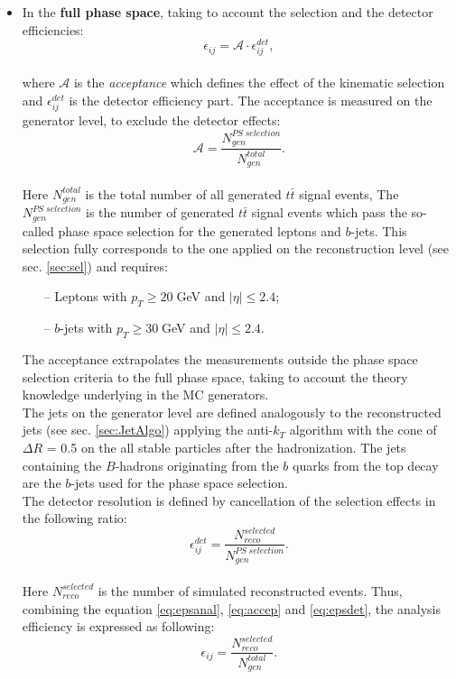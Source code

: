 \begin{itemize}
 \item In the \textbf{full phase space}, taking to account the selection and the detector efficiencies:
 \begin{equation}\label{eq:epsanal}
  \epsilon_{ij} = \mathcal{A} \cdot \epsilon_{ij}^{det},
 \end{equation}
 \\
 where $\mathcal{A}$ is the \textit{acceptance} which defines the effect of the kinematic selection and $\epsilon_{ij}^{det}$ is the detector efficiency part.
 The acceptance is measured on the generator level, to exclude the detector effects:
 \\
 \begin{equation}\label{eq:accep}
  \mathcal{A} = \frac{N^{PS\;selection}_{gen}}{N^{total}_{gen}}.
 \end{equation}
 \\
 Here $N^{total}_{gen}$ is the total number of all generated $t\bar{t}$ signal events,
 The $N_{gen}^{PS\;selection}$ is the number of generated $t\bar{t}$ signal events which pass the so-called phase space selection for the generated leptons and 
 $b$-jets. This selection fully corresponds to the one applied on the reconstruction level (see sec. \ref{sec:sel}) and requires:
 \begin{itemize}
  \item[--] Leptons with $p_{T} \geq 20\;$GeV and $|\eta| \leq 2.4$;
  \item[--] $b$-jets with $p_{T} \geq 30\;$GeV and $|\eta| \leq 2.4$.
 \end{itemize}
 The acceptance extrapolates the measurements outside the phase space selection criteria to the full phase space, taking to account the theory knowledge underlying in the MC generators.
 \\
 The jets on the generator level are defined analogously to the reconstructed jets (see sec. \ref{sec:JetAlgo}) applying the anti-$k_{T}$ algorithm with the 
 cone of $\Delta R$ = 0.5 on the all stable particles after the hadronization. The jets containing the $B$-hadrons originating from the $b$ quarks from the
 top decay are the $b$-jets used for the phase space selection.
 \\
 The detector resolution is defined by cancellation of the selection effects in the following ratio:
 \\
 \begin{equation}\label{eq:epsdet}
  \epsilon_{ij}^{det} = \frac{N^{selected}_{reco}}{N^{PS\;selection}_{gen}}.
 \end{equation}
 \\
 Here $N^{selected}_{reco}$ is the number of simulated reconstructed events. Thus, combining the equation \ref{eq:epsanal}, \ref{eq:accep} and \ref{eq:epsdet},
 the analysis efficiency is expressed as following:
 \\
 \begin{equation}
  \epsilon_{ij} = \frac{N^{selected}_{reco}}{N^{total}_{gen}}.
 \end{equation}
 

\end{itemize}
